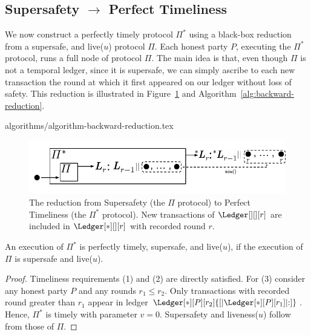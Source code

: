 \subsection{Supersafety $\rightarrow$ Perfect Timeliness}\label{sec:backward-reduction}

We now construct a perfectly timely protocol $\Pi^*$
using a black-box reduction from a supersafe, and live($u$) protocol $\Pi$.
Each honest party $P$, executing the $\Pi^*$ protocol, runs a
full node of protocol $\Pi$.
The main idea is that, even though $\Pi$ is not a temporal ledger,
since it is supersafe, we can simply
ascribe to each new transaction the round at which it first appeared on our ledger
without loss of safety.
This reduction is illustrated in Figure~\ref{fig:backward-reduction}
and Algorithm~\ref{alg:backward-reduction}.

{algorithms/algorithm-backward-reduction.tex}

\begin{figure}
  \centering
  \includegraphics[width=0.9\columnwidth,keepaspectratio]{figures/backward-reduction.pdf}
  \caption{The reduction from Supersafety
    (the $\Pi$ protocol) to Perfect Timeliness (the $\Pi^*$ protocol).
    New transactions of $\Ledger[][][r]$ are included in
    $\Ledger[*][][r]$ with recorded round $r$.
  }
 \label{fig:backward-reduction}
\end{figure}


\begin{theorem} \label{thm:backward-reduction}
  An execution of $\Pi^*$ is perfectly timely, supersafe, and live($u$), if the execution of
  $\Pi$ is supersafe and live($u$).
\end{theorem}
\begin{proof}
  Timeliness requirements (1) and (2) are directly satisfied.
  For (3) consider any honest party $P$ and any rounds $r_1 \leq r_2$.
  Only transactions with recorded round greater
  than $r_1$ appear in ledger $\Ledger[*][P][r_2]{[|\Ledger[*][P][r_1]|{:}]}$.
  Hence, $\Pi^*$ is timely with parameter $v = 0$.
  Supersafety and liveness($u$) follow from those of $\Pi$.
  \Qed
\end{proof}

